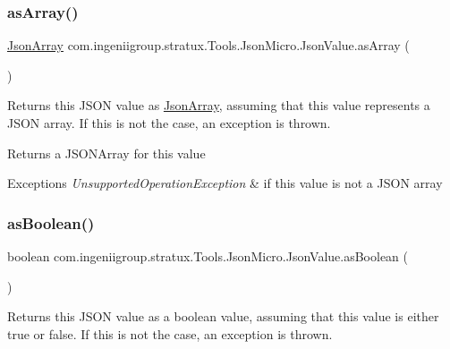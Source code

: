 \subsubsection{\texorpdfstring{as\+Array()}{asArray()}}
{\footnotesize\ttfamily \hyperlink{classcom_1_1ingeniigroup_1_1stratux_1_1_tools_1_1_json_micro_1_1_json_array}{Json\+Array} com.\+ingeniigroup.\+stratux.\+Tools.\+Json\+Micro.\+Json\+Value.\+as\+Array (\begin{DoxyParamCaption}{ }\end{DoxyParamCaption})}

Returns this J\+S\+ON value as \hyperlink{classcom_1_1ingeniigroup_1_1stratux_1_1_tools_1_1_json_micro_1_1_json_array}{Json\+Array}, assuming that this value represents a J\+S\+ON array. If this is not the case, an exception is thrown.

\begin{DoxyReturn}{Returns}
a J\+S\+O\+N\+Array for this value 
\end{DoxyReturn}

\begin{DoxyExceptions}{Exceptions}
{\em Unsupported\+Operation\+Exception} & if this value is not a J\+S\+ON array \\
\hline
\end{DoxyExceptions}
\mbox{\label{classcom_1_1ingeniigroup_1_1stratux_1_1_tools_1_1_json_micro_1_1_json_value_ad3b9b6972e0be22222138129f26d1d3d}} 
\subsubsection{\texorpdfstring{as\+Boolean()}{asBoolean()}}
{\footnotesize\ttfamily boolean com.\+ingeniigroup.\+stratux.\+Tools.\+Json\+Micro.\+Json\+Value.\+as\+Boolean (\begin{DoxyParamCaption}{ }\end{DoxyParamCaption})}

Returns this J\+S\+ON value as a {\ttfamily boolean} value, assuming that this value is either {\ttfamily true} or {\ttfamily false}. If this is not the case, an exception is thrown.

